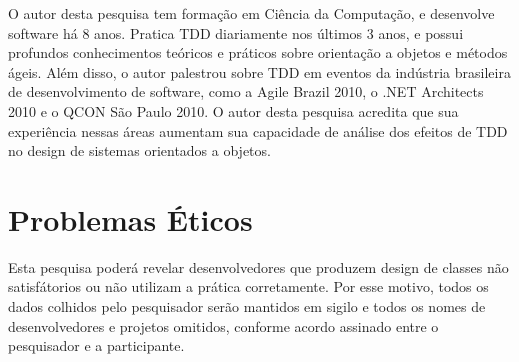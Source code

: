 O autor desta pesquisa tem formação em Ciência da Computação, e desenvolve software há 8
anos. Pratica TDD diariamente nos últimos 3 anos, e possui profundos
conhecimentos teóricos e práticos sobre orientação a objetos e métodos ágeis.
Além disso, o autor palestrou sobre TDD em eventos da indústria brasileira
de desenvolvimento de software, como a Agile Brazil 2010, o .NET Architects
2010 e o QCON São Paulo 2010. O autor desta pesquisa acredita que sua experiência nessas
áreas aumentam sua capacidade de análise dos efeitos de TDD no design de sistemas 
orientados a objetos.

\section{Problemas Éticos}
\label{sec:planejamento-etica}

Esta pesquisa poderá revelar desenvolvedores que produzem design de classes não
satisfátorios ou não utilizam a prática corretamente.
Por esse motivo, todos os dados colhidos pelo pesquisador serão mantidos em
sigilo e todos os nomes de desenvolvedores e projetos omitidos, conforme acordo 
assinado entre o pesquisador e a participante.

